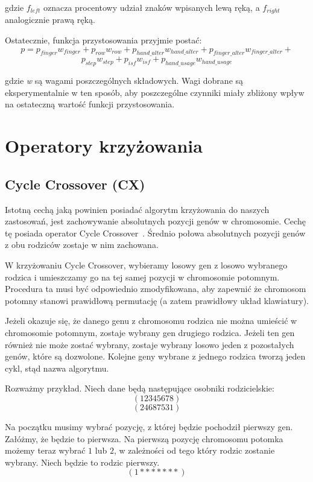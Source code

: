 \documentclass[brudnopis]{xmgr}
\begin{document}
gdzie $f_{left}$ oznacza procentowy udział znaków wpisanych lewą ręką, a $f_{right}$ analogicznie prawą ręką.\newline\newline


\noindent Ostatecznie, funkcja przystosowania przyjmie postać:
$$ p = p_{finger} w_{finger} + p_{row} w_{row} + p_{hand\_alter} w_{hand\_alter} + p_{finger\_alter} w_{finger\_alter} + $$
$$ p_{step} w_{step} + p_{isf} w_{isf} + p_{hand\_usage} w_{hand\_usage} $$

\noindent
gdzie \emph{w} są wagami poszczególnych składowych. Wagi dobrane są eksperymentalnie w ten sposób, aby poszczególne czynniki miały zbliżony wpływ na ostateczną wartość funkcji przystosowania.


\section{Operatory krzyżowania}

\subsection{Cycle Crossover (CX)}

Istotną cechą jaką powinien posiadać algorytm krzyżowania do naszych zastosowań, jest zachowywanie absolutnych pozycji genów w chromosomie. Cechę tę posiada operator Cycle Crossover~\cite{Larranaga99geneticalgorithms}. Średnio połowa absolutnych pozycji genów z obu rodziców zostaje w nim zachowana.

W krzyżowaniu Cycle Crossover, wybieramy losowy gen z losowo wybranego rodzica i umieszczamy go na tej samej pozycji w chromosomie potomnym. Procedura ta musi być odpowiednio zmodyfikowana, aby zapewnić że chromosom potomny stanowi prawidłową permutację (a zatem prawidłowy układ klawiatury).

Jeżeli okazuje się, że danego genu z chromosomu rodzica nie można umieścić w chromosomie potomnym, zostaje wybrany gen drugiego rodzica. Jeżeli ten gen również nie może zostać wybrany, zostaje wybrany losowo jeden z pozostałych genów, które są dozwolone. Kolejne geny wybrane z jednego rodzica tworzą jeden cykl, stąd nazwa algorytmu.

Rozważmy przykład. Niech dane będą następujące osobniki rodzicielskie:
$$ (1 2 3 4 5 6 7 8) $$
$$ (2 4 6 8 7 5 3 1) $$

Na początku musimy wybrać pozycję, z której będzie pochodził pierwszy gen. Załóżmy, że będzie to pierwsza. Na pierwszą pozycję chromosomu potomka możemy teraz wybrać $1$ lub $2$, w zależności od tego który rodzic zostanie wybrany. Niech będzie to rodzic pierwszy.
$$ (1 * * * * * * *) $$
\end{document}
